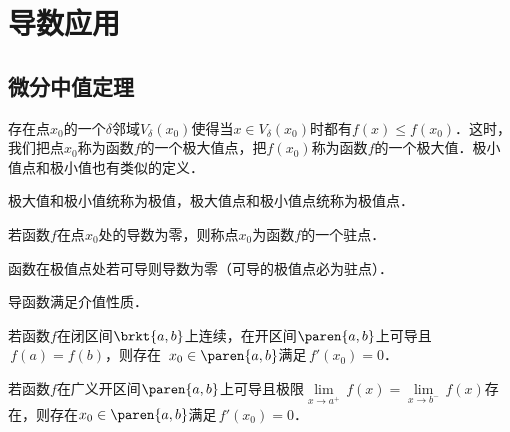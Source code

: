 \chapter{导数应用}

\section{微分中值定理}

\begin{definition*}
  \label{defn:extrema}
  存在点\(x_0\)的一个\(\delta\)邻域\(V_\delta(x_0)\)使得当\(x \in V_\delta(x_0)\)时都有\(f(x) \le f(x_0)\)．这时，我们把点\(x_0\)称为函数\(f\)的一个极大值点，把\(f(x_0)\)称为函数\(f\)的一个极大值．极小值点和极小值也有类似的定义．

  极大值和极小值统称为极值，极大值点和极小值点统称为极值点．
\end{definition*}


\begin{definition*}
  \label{defn:stationary}
  若函数\(f\)在点\(x_0\)处的导数为零，则称点\(x_0\)为函数\(f\)的一个驻点．
\end{definition*}

\begin{theorem}[费马驻点定理]
  \label{thm:fermat}
  函数在极值点处若可导则导数为零（可导的极值点必为驻点）．
\end{theorem}

\begin{corollary}[达布定理]
  \label{cor:darboux}
  导函数满足介值性质．
\end{corollary}

\begin{corollary}[罗尔定理]
  \label{cor:rolle}
  若函数\(f\)在闭区间\(\brkt{a,b}\)上连续，在开区间\(\paren{a,b}\)上可导且\(\,f(a) = f(b)\)，则存在~\(x_0 \in \paren{a,b}\)满足\(\,f'(x_0) = 0\)．
\end{corollary}

\begin{theorem*}[广义罗尔定理]
  \label{thm:genrolle}
  若函数\(f\)在广义开区间\(\paren{a,b}\)上可导且极限\(\!\lim\limits_{x\to a^+\!} \,f(x) = \lim\limits_{x\to b^-\!} \,f(x)\)存在，则存在\(x_0 \in \paren{a,b}\)满足\(\,f'(x_0) = 0\)．
\end{theorem*}

